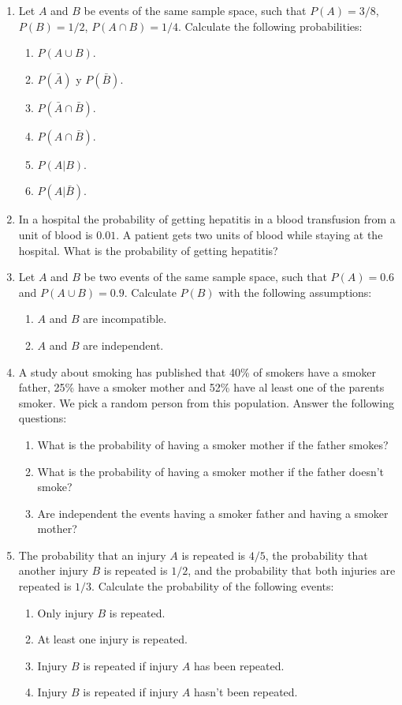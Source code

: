 \begin{enumerate}[leftmargin=*,resume]
\item Let $A$ and $B$ be events of the same sample space, such that $P(A)=3/8$, $P(B)=1/2$, $P(A\cap B)=1/4$.
Calculate the following probabilities:
\begin{enumerate}
\item  $P(A\cup B)$.
\item  $P(\bar A)$ y $P(\bar B)$.
\item  $P(\bar A\cap \bar B)$.
\item  $P(A\cap \bar B)$.
\item  $P(A|B)$.
\item  $P(A|\bar B)$.
\end{enumerate}

\item In a hospital the probability of getting hepatitis in a blood transfusion from a unit of blood is $0.01$.
A patient gets two units of blood while staying at the hospital.
What is the probability of getting hepatitis?

\item Let $A$ and $B$ be two events of the same sample space, such that $P(A)=0.6$ and $P(A\cup B)=0.9.$
Calculate $P(B)$ with the following assumptions:
\begin{enumerate}
\item $A$ and $B$ are incompatible.
\item $A$ and $B$ are independent.
\end{enumerate}

\item A study about smoking has published that 40\% of smokers have a smoker father, 25\% have a smoker mother and 52\%
have al least one of the parents smoker.
We pick a random person from this population.
Answer the following questions: 
\begin{enumerate}
\item What is the probability of having a smoker mother if the father smokes?
\item What is the probability of having a smoker mother if the father doesn't smoke?
\item Are independent the events having a smoker father and having a smoker mother?
\end{enumerate}

\item The probability that an injury $A$ is repeated is $4/5$, the probability that another injury $B$ is repeated is
$1/2$, and the probability that both injuries are repeated is $1/3$.
Calculate the probability of the following events:
\begin{enumerate}
\item Only injury $B$ is repeated.
\item At least one injury is repeated.
\item Injury $B$ is repeated if injury $A$ has been repeated.
\item Injury $B$ is repeated if injury $A$ hasn't been repeated. 
\end{enumerate}


\end{enumerate}
